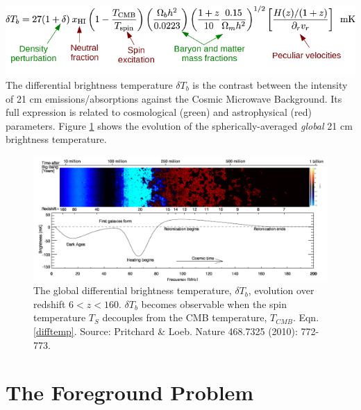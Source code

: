 \documentclass[a0,landscape]{a0poster}
\begin{document}
\begin{multicols}{4}
\includegraphics[scale=1]{figures/differential_brightness.png}
The differential brightness temperature $\delta T_b$ is the contrast between the intensity of 21 cm emissions/absorptions against the Cosmic Microwave Background. Its full expression is related to cosmological (green) and astrophysical (red) parameters. Figure \ref{global} shows the evolution of the spherically-averaged \emph{global} 21 cm brightness temperature.

\begin{figure}[H]
\centering
\includegraphics[width=1.0\linewidth]{figures/global_history.png}
\caption{The global differential brightness temperature, $\delta T_b$, evolution over redshift $6<z<160$. $\delta T_b$ becomes observable when the spin temperature $T_S$ decouples from the CMB temperature, $T_{CMB}$.
Eqn. \ref{difftemp}. Source: Pritchard \& Loeb. Nature 468.7325 (2010): 772-773. }\label{global}
\end{figure}

\section*{The Foreground Problem} %


\end{multicols}
\end{document}
